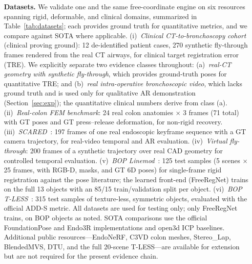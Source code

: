 \documentclass[9pt,twoside,web]{ieeecolor2}
\begin{document}
\textbf{Datasets.} We validate one and the same free-coordinate engine on six resources spanning rigid, deformable, and clinical domains, summarized in Table~\ref{tab:datasets}; each provides ground truth for quantitative metrics, and we compare against SOTA where applicable. (i)~\emph{Clinical CT-to-bronchoscopy cohort} (clinical proving ground): 12 de-identified patient cases, 270 synthetic fly-through frames rendered from the real CT airways, for clinical target registration error (TRE). We explicitly separate two evidence classes throughout: (a)~\emph{real-CT geometry with synthetic fly-through}, which provides ground-truth poses for quantitative TRE; and (b)~\emph{real intra-operative bronchoscopic video}, which lacks ground truth and is used only for qualitative AR demonstration (Section~\ref{sec:exp}); the quantitative clinical numbers derive from class (a). (ii)~\emph{Real-colon FEM benchmark}: 24 real colon anatomies $\times$ 3 frames (71 total) with GT poses and GT press--release deformation, for non-rigid recovery. (iii)~\emph{SCARED}~\cite{allan2021scared}: 197 frames of one real endoscopic keyframe sequence with a GT camera trajectory, for real-video temporal and AR evaluation. (iv)~\emph{Virtual fly-through}: 200 frames of a synthetic trajectory over real CAD geometry for controlled temporal evaluation. (v)~\emph{BOP Linemod}~\cite{hodan2018bop}: 125 test samples (5 scenes $\times$ 25 frames, with RGB-D, masks, and GT 6D poses) for single-frame rigid registration against the pose literature; the learned front-end (FreeRegNet) trains on the full 13 objects with an 85/15 train/validation split per object. (vi)~\emph{BOP T-LESS}~\cite{hodan2018bop}: 315 test samples of texture-less, symmetric objects, evaluated with the official ADD-S metric. All datasets are used for testing only; only FreeRegNet trains, on BOP objects as noted. SOTA comparisons use the official FoundationPose and Endo3R implementations and open3d ICP baselines. Additional public resources---EndoNeRF, C3VD colon meshes, Stereo\_Lap, BlendedMVS, DTU, and the full 20-scene T-LESS---are available for extension but are not required for the present evidence chain.
\end{document}
